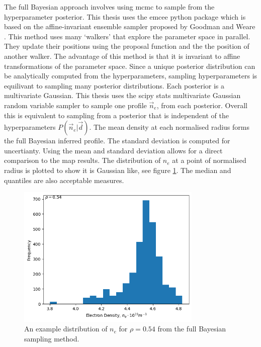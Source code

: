 The full Bayesian approach involves using \gls{mcmc} to sample from the hyperparameter posterior. This thesis uses the emcee python package which is based on the affine-invariant ensemble sampler proposed by Goodman and Weare \cite{emceeGoodman}. This method uses many `walkers' that explore the parameter space in parallel. They update their positions using the proposal function and the the position of another walker. The advantage of this method is that it is invariant to affine transformations of the parameter space. Since a unique posterior distribution can be analytically computed from the hyperparameters, sampling hyperparameters is equilivant to sampling many posterior distributions. Each posterior is a multivariate Gaussian. This thesis uses the scipy stats multivariate Gaussian random variable sampler to sample one profile $\vec n_e$, from each posterior. Overall this is equivalent to sampling from a posterior that is independent of the hyperparameters $P(\vec n_e | \vec d)$. The mean density at each normalised radius forms the full Bayesian inferred profile. The standard deviation is computed for uncertianty. Using the mean and standard deviation allows for a direct comparison to the \gls{map} results. The distribution of $n_e$ at a point of normalised radius is plotted to show it is Gaussian like, see figure \ref{fig:ne_dist}. The median and quantiles are also acceptable measures.

\begin{figure}[H]
    \centering
    \includegraphics[width=250pt]{images/Final/sampled_ne_dist.png}
    \caption{An example distribution of $n_e$ for $\rho=0.54$ from the full Bayesian sampling method.}
    \label{fig:ne_dist}
\end{figure}

